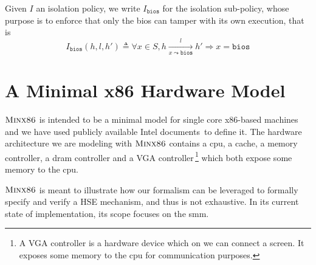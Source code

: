 \begin{definition}
  \label{def:speccert:biospol}
  Given $I$ an isolation policy, we write $I_{\mathtt{bios}}$ for the isolation
  sub-policy, whose purpose is to enforce that only the \ac{bios} can tamper
  with its own execution, that is
  \[
    I_{\mathtt{bios}}(h, l, h') \triangleq \forall x \in S, h \xrightarrow[x
    \leadsto \mathtt{bios}]{l} h' \Rightarrow x = \mathtt{bios}
  \]
\end{definition}

%

\section{A Minimal x86 Hardware Model}
\label{sec:speccert2:minx86}

$\textsc{Minx86}$ is intended to be a minimal model for single core x86-based
machines and we have used publicly available Intel
documents\,\cite{intel2013celeron,intel2009mch,intel2014manual} to define it.
%
The hardware architecture we are modeling with $\textsc{Minx86}$ contains a
\ac{cpu}, a cache, a memory controller, a \ac{dram} controller and a VGA
controller\,\footnote{A VGA controller is a hardware device which on we can
  connect a screen. It exposes some memory to the \ac{cpu} for communication
  purposes.} which both expose some memory to the \ac{cpu}.

$\textsc{Minx86}$ is meant to illustrate how our formalism can be leveraged
to formally specify and verify a HSE mechanism, and thus is not exhaustive.
%
In its current state of implementation, its scope focuses on the \ac{smm}.


